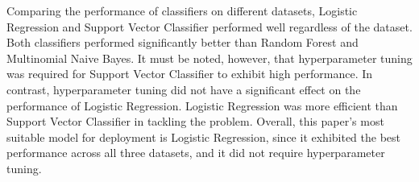 Comparing the performance of classifiers on different datasets, Logistic Regression and Support Vector Classifier performed well regardless of the dataset. Both classifiers performed significantly better than Random Forest and Multinomial Naive Bayes. It must be noted, however, that hyperparameter tuning was required for Support Vector Classifier to exhibit high performance. In contrast, hyperparameter tuning did not have a significant effect on the performance of Logistic Regression. Logistic Regression was more efficient than Support Vector Classifier in tackling the problem. Overall, this paper's most suitable model for deployment is Logistic Regression, since it exhibited the best performance across all three datasets, and it did not require hyperparameter tuning.
